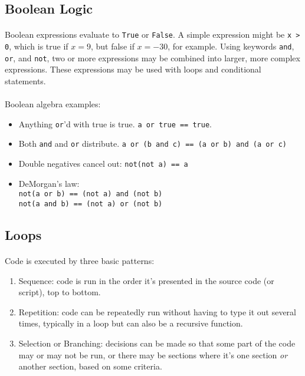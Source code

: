 \documentclass[letter,10pt]{article}
\begin{document}
\subsection{Boolean Logic}
\paragraph{}Boolean expressions evaluate to \verb|True| or \verb|False|. A simple expression might be \verb|x > 0|, which is true if $x = 9$, but false if $x = -30$, for example. Using keywords \verb|and|, \verb|or|, and \verb|not|, two or more expressions may be combined into larger, more complex expressions. These expressions may be used with loops and conditional statements.

\paragraph{}Boolean algebra examples:
\begin{itemize}
    \item Anything \verb|or|'d with true is true. \verb|a or true == true|.
    \item Both \verb|and| and \verb|or| distribute. \verb|a or (b and c) == (a or b) and (a or c)|
    \item Double negatives cancel out: \verb|not(not a) == a|
    \item DeMorgan's law: \\
        \verb|not(a or b) == (not a) and (not b)| \\
        \verb|not(a and b) == (not a) or (not b)|
\end{itemize}

\subsection{Loops}
\paragraph{}Code is executed by three basic patterns:
\begin{enumerate}
    \item Sequence: code is run in the order it's presented in the source code (or script), top to bottom.
    \item Repetition: code can be repeatedly run without having to type it out several times, typically in a loop but can also be a recursive function.
    \item Selection or Branching: decisions can be made so that some part of the code may or may not be run, or there may be sections where it's one section \textit{or} another section, based on some criteria.
\end{enumerate}
\end{document}
